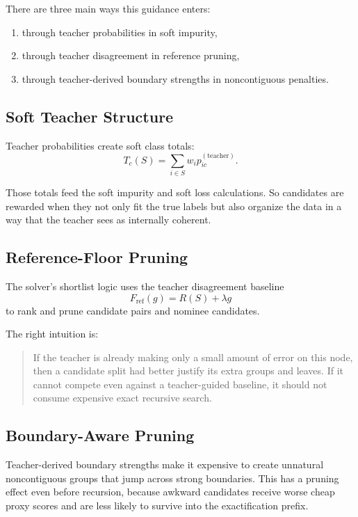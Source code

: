 \documentclass[11pt]{article}
\begin{document}
There are three main ways this guidance enters:

\begin{enumerate}
\item through teacher probabilities in soft impurity,
\item through teacher disagreement in reference pruning,
\item through teacher-derived boundary strengths in noncontiguous penalties.
\end{enumerate}

\subsection{Soft Teacher Structure}

Teacher probabilities create soft class totals:
\[
T_c(S) = \sum_{i \in S} w_i p_{ic}^{(\mathrm{teacher})}.
\]

Those totals feed the soft impurity and soft loss calculations. So candidates are rewarded when they not only fit the true labels but also organize the data in a way that the teacher sees as internally coherent.

\subsection{Reference-Floor Pruning}

The solver's shortlist logic uses the teacher disagreement baseline
\[
F_{\mathrm{ref}}(g) = R(S) + \lambda g
\]
to rank and prune candidate pairs and nominee candidates.

The right intuition is:

\begin{quote}
If the teacher is already making only a small amount of error on this node, then a candidate split had better justify its extra groups and leaves. If it cannot compete even against a teacher-guided baseline, it should not consume expensive exact recursive search.
\end{quote}

\subsection{Boundary-Aware Pruning}

Teacher-derived boundary strengths make it expensive to create unnatural noncontiguous groups that jump across strong boundaries. This has a pruning effect even before recursion, because awkward candidates receive worse cheap proxy scores and are less likely to survive into the exactification prefix.
\end{document}
